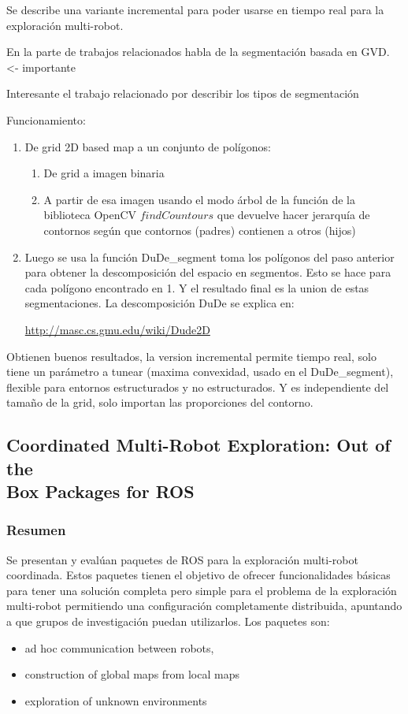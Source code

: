 Se describe una variante incremental para poder usarse en tiempo real para la exploración multi-robot.

En la parte de trabajos relacionados habla de la segmentación basada en GVD. <- importante

Interesante el trabajo relacionado por describir los tipos de segmentación

Funcionamiento:
\begin{enumerate}
  \item De grid 2D based map a un conjunto de polígonos:
  \begin{enumerate}
     \item De grid a imagen binaria
     \item A partir de esa imagen usando el modo árbol de la función de la biblioteca OpenCV $findCountours$ que devuelve hacer jerarquía de contornos según que contornos (padres) contienen a otros (hijos)
  \end{enumerate}
\item Luego se usa la función DuDe\_segment toma los polígonos del paso anterior para obtener la descomposición del espacio en segmentos. Esto se hace para cada polígono encontrado en 1. Y el resultado final es la union de estas segmentaciones. La descomposición DuDe se explica en: 

  \url{http://masc.cs.gmu.edu/wiki/Dude2D}
\end{enumerate}

Obtienen buenos resultados, la version incremental permite tiempo real, solo tiene un parámetro a tunear (maxima convexidad, usado en el DuDe\_segment), flexible para entornos estructurados y no estructurados. Y es independiente del tamaño de la grid, solo importan las proporciones del contorno.

\subsection[Coordinated Multi-Robot Exploration: Out of the Box Packages for ROS]{Coordinated Multi-Robot Exploration: Out of the\\ Box Packages for ROS}
\subsubsection{Resumen}
Se presentan y evalúan paquetes de ROS para la exploración multi-robot coordinada. Estos paquetes tienen el objetivo de ofrecer funcionalidades básicas para tener una solución completa pero simple para el problema de la exploración multi-robot permitiendo una configuración completamente distribuida, apuntando a que grupos de investigación puedan utilizarlos. Los paquetes son:
\begin{itemize}
  \item ad hoc communication between robots,
  \item construction of global maps from local maps
  \item exploration of unknown environments
\end{itemize}


